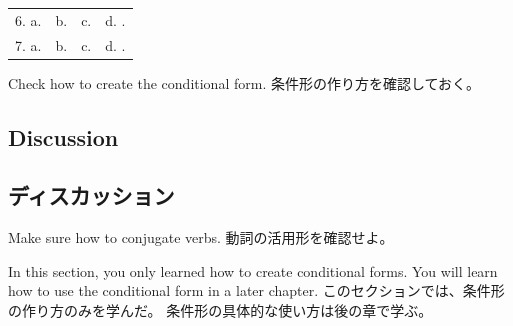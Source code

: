 \documentclass[uplatex,dvipdfmx,b5paper,english,10pt]{jsbook}
\begin{document}
\begin{tabular}[t]{llll}
 6. a. \underline{\hspace{6zw}}& b. \underline{\hspace{6zw}} & c. \underline{\hspace{6zw}} & d. \underline{\hspace{6zw}}.\\
 7. a. \underline{\hspace{6zw}}& b. \underline{\hspace{6zw}} & c. \underline{\hspace{6zw}} & d. \underline{\hspace{6zw}}.\\
\end{tabular}

\begin{toianswer}
\ifEnglish
Check how to create the conditional form.
\else
条件形の作り方を確認しておく。
\fi
\end{toianswer}

\ifEnglish
\subsection{Discussion}
\else
\subsection{ディスカッション}
\fi

\begin{toiquestion}
\ifEnglish
Make sure how to conjugate verbs.
\else
動詞の活用形を確認せよ。
\fi
\end{toiquestion}
\begin{toianswer}
\ifEnglish
In this section, you only learned how to create conditional forms.
You will learn how to use the conditional form in a later chapter.
\else
このセクションでは、条件形の作り方のみを学んだ。
条件形の具体的な使い方は後の章で学ぶ。
\fi
\end{toianswer}
\end{document}
